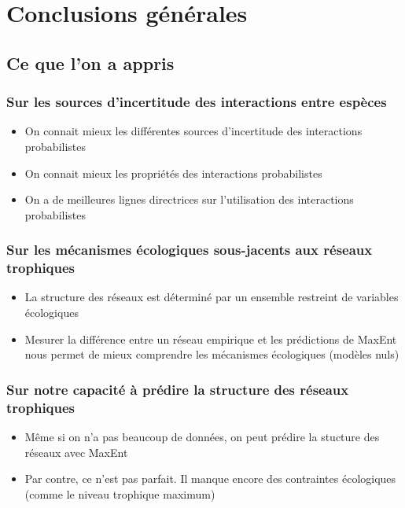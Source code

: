 
\francais   
\chapter*{Conclusions générales}

\section{Ce que l'on a appris}

\subsection{Sur les sources d'incertitude des interactions entre espèces} 

\begin{itemize}
    \item On connait mieux les différentes sources d'incertitude des interactions probabilistes 
    \item On connait mieux les propriétés des interactions probabilistes 
    \item On a de meilleures lignes directrices sur l'utilisation des interactions probabilistes
\end{itemize}

\subsection{Sur les mécanismes écologiques sous-jacents aux réseaux trophiques} 

\begin{itemize}
    \item La structure des réseaux est déterminé par un ensemble restreint de variables écologiques
    \item Mesurer la différence entre un réseau empirique et les prédictions de MaxEnt nous permet de mieux comprendre les mécanismes écologiques (modèles nuls)
\end{itemize}


\subsection{Sur notre capacité à prédire la structure des réseaux trophiques} 

\begin{itemize}
    \item Même si on n'a pas beaucoup de données, on peut prédire la stucture des réseaux avec MaxEnt
    \item Par contre, ce n'est pas parfait. Il manque encore des contraintes écologiques (comme le niveau trophique maximum)
\end{itemize}



